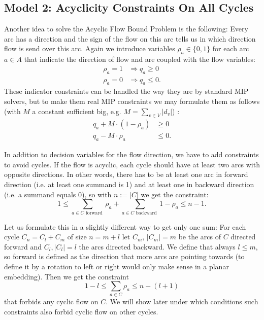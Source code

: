 \subsection{Model 2: Acyclicity Constraints On All Cycles}
\label{model:AcyclicityConstraints}
Another idea to solve the Acyclic Flow Bound Problem 
is the following: Every arc has a direction and the 
sign of the flow on this arc tells us in which direction flow is send over this arc. Again we introduce variables 
$\rho_a\in \{0,1\}$ for each arc $a\in A$ that indicate the direction of flow and are coupled with the flow variables:
\begin{align*}
\rho_a=1 & \Rightarrow q_a\ge 0 \\
\rho_a=0 & \Rightarrow q_a\le 0.
\end{align*}
These indicator constraints can be handled the way they are by standard MIP solvers, but to make them real MIP 
constraints we may formulate them as follows (with $M$ a constant sufficient big, e.g. $M=\sum_{v\in V}|d_v|$) :
\begin{align*}
 q_a + M\cdot (1-\rho_a) &\ge 0\\
 q_a - M\cdot \rho_a & \le 0.
\end{align*}

In addition to decision variables for the flow direction, we have to add constraints to avoid cycles. If the flow is 
acyclic, each cycle should have at least two arcs with opposite directions. In other words, there has to be at least 
one arc in forward direction (i.e. at least one summand is 1) and at least one in backward direction (i.e. a summand 
equals 0), so with $n:=|C|$ we get the constraint:
$$ 1\le\sum_{a\in C\textrm{ forward }} \rho_a + \sum_{a\in C\textrm{ backward }}1-\rho_a\le n-1.$$

Let us formulate this in a slightly different way to get only one sum: For each cycle $C_n=C_l+C_m$ of size $n=m+l$
let $C_m, \, |C_m|=m$ be the arcs of $C$ directed forward and $C_l, |C_l|= l$ the arcs directed backward. We define 
that always 
$l\le m$, so forward is defined as the direction that more arcs are pointing towards (to define it by a rotation to 
left or right would only make sense in a planar embedding). Then we get the constraint $$1-l \le \sum_{a\in C}\rho_a\le 
n-(l+1)$$ that forbids any cyclic flow on $C$. We will show later under which conditions such constraints also forbid 
cyclic flow on other cycles. 

